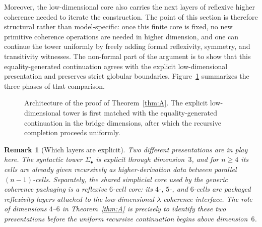 \documentclass[webpdf,traditional,large,numbered]{oup-authoring-template}
\theoremstyle{thmstyleone}%
\theoremstyle{thmstyletwo}%
\newtheorem{remark}[theorem]{Remark}
\theoremstyle{thmstylethree}%
\begin{document}
Moreover, the low-dimensional core also carries the next layers of reflexive
higher coherence needed to iterate the construction.  The point of this section
is therefore structural rather than model-specific: once this finite core is
fixed, no new primitive coherence operations are needed in higher dimension,
and one can continue the tower uniformly by freely adding formal reflexivity,
symmetry, and transitivity witnesses.  The non-formal part of the argument is
to show that this equality-generated continuation agrees with the explicit
low-dimensional presentation and preserves strict globular boundaries.
Figure~\ref{fig:tower-architecture} summarizes the three phases of that
comparison.

\begin{figure}[htbp]
\centering
{}
\caption{Architecture of the proof of Theorem~\ref{thm:A}.  The explicit low-dimensional tower is first matched with the equality-generated continuation in the bridge dimensions, after which the recursive completion proceeds uniformly.}
\label{fig:tower-architecture}
\end{figure}

\begin{remark}[Which layers are explicit]
Two different presentations are in play here.  The syntactic tower
$\Sigma_\bullet$ is explicit through dimension~$3$, and for $n\ge 4$ its cells
are already given recursively as higher-derivation data between parallel
$(n-1)$-cells.  Separately, the shared simplicial core used by the generic
coherence packaging is a reflexive $6$-cell core: its $4$-, $5$-, and $6$-cells
are packaged reflexivity layers attached to the low-dimensional
$\lambda$-coherence interface.  The role of dimensions $4$--$6$ in
Theorem~\ref{thm:A} is precisely to identify these two presentations before the
uniform recursive continuation begins above dimension~$6$.
\end{remark}
\end{document}
